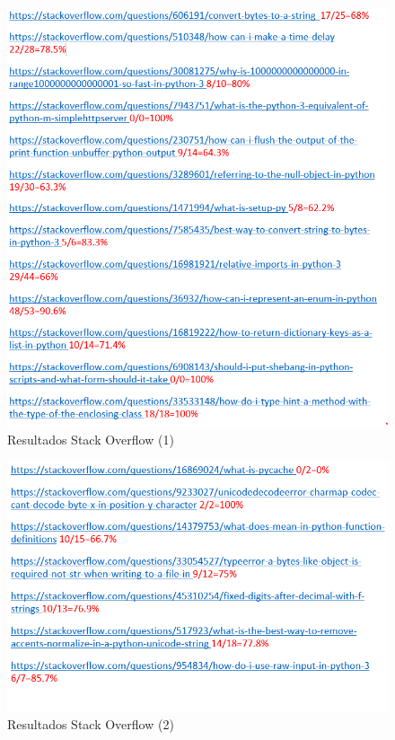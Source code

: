 \documentclass[a4paper, 12pt]{book}
\begin{document}
\begin{figure}
	\centering
    \includegraphics[width=1\textwidth]{img/stack5}
    \caption{Resultados Stack Overflow (1)}
\end{figure}
 
\begin{figure}
	\centering
    \includegraphics[width=1\textwidth]{img/stack6}
    \caption{Resultados Stack Overflow (2)}
 \end{figure}
 
\end{document}
